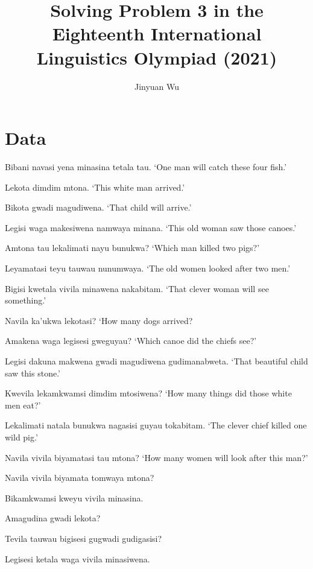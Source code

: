 \documentclass{article}
\title{Solving Problem 3 in the Eighteenth International Linguistics Olympiad (2021)}
\author{Jinyuan Wu}
\def\\{}%
\begin{document}
\maketitle

\automath

\section{Data}\label{sec:data}

\begin{exe}

\ex\label{ex:1} Bibani navasi yena minasina tetala tau. \\
`One man will catch these four fish.'

\ex\label{ex:2} Lekota dimdim mtona. \\
`This white man arrived.'

\ex\label{ex:3} Bikota gwadi magudiwena. \\
`That child will arrive.'

\ex\label{ex:4} Legisi waga makesiwena namwaya minana. \\
`This old woman saw those canoes.'

\ex\label{ex:5} Amtona tau lekalimati nayu bunukwa? \\
`Which man killed two pigs?'

\ex\label{ex:6} Leyamatasi teyu tauwau nunumwaya. \\
`The old women looked after two men.'

\ex\label{ex:7} Bigisi kwetala vivila minawena nakabitam. \\
`That clever woman will see something.'

\ex\label{ex:8} Navila ka’ukwa lekotasi? \\
`How many dogs arrived?

\ex\label{ex:9} Amakena waga legisesi gweguyau? \\
`Which canoe did the chiefs see?'

\ex\label{ex:10} Legisi dakuna makwena gwadi magudiwena gudimanabweta. \\
`That beautiful child saw this stone.'

\ex\label{ex:11} Kwevila lekamkwamsi dimdim mtosiwena? \\
`How many things did those white men eat?'

\ex\label{ex:12} Lekalimati natala bunukwa nagasisi guyau tokabitam. \\
`The clever chief killed one wild pig.'

\ex\label{ex:13} Navila vivila biyamatasi tau mtona? \\
`How many women will look after this man?'

\ex\label{ex:14}  Navila vivila biyamata tomwaya mtona?

\ex\label{ex:15} Bikamkwamsi kweyu vivila minasina.

\ex\label{ex:16} Amagudina gwadi lekota?

\ex\label{ex:17} Tevila tauwau bigisesi gugwadi gudigasisi?

\ex\label{ex:18} Legisesi ketala waga vivila minasiwena.

\end{exe}
\end{document}
